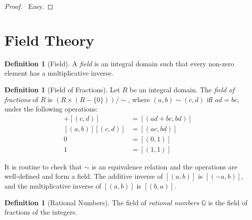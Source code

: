 \documentclass{article}
\let\qed\relax
\theoremstyle{definition}
\newtheorem{definition}[axiom]{Definition}
\begin{document}
    \begin{proof}
        \pf\ Easy. \qed
    \end{proof}

    \section{Field Theory}

    \begin{definition}[Field]
        A \emph{field} is an integral domain such that every non-zero element has a multiplicative inverse.
    \end{definition}

    \begin{definition}[Field of Fractions]
        Let $R$ be an integral domain. The \emph{field of fractions} of $R$ is $(R \times (R - \{ 0 \})) / \sim$,
        where $(a,b) \sim (c,d)$ iff $ad = bc$, under the following operations:
        \begin{align*}
            [(a,b)] + [(c,d)] & = [(ad+bc,bd)] \\
            [(a,b)][(c,d)] & = [(ac,bd)] \\
            0 & = [(0,1)] \\
            1 & = [(1,1)]
        \end{align*}

        It is routine to check that $\sim$ is an equivalence relation and the operations are well-defined
        and form a field. The additive inverse of $[(a,b)]$ is $[(-a,b)]$, and the multiplicative inverse
        of $[(a,b)]$ is $[(b,a)]$.
    \end{definition}

    \begin{definition}[Rational Numbers]
        The field of \emph{rational numbers} $\mathbb{Q}$ is the field of fractions of the integers.
    \end{definition}


\end{document}
